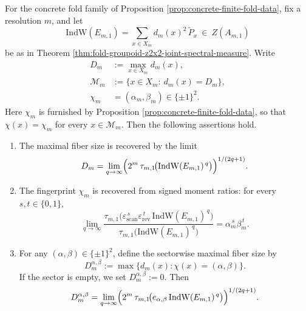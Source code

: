 \begin{corollary}\label{cor:fold-indw-high-q-extract-maxfiber-and-chi}

For the concrete fold family of Proposition \ref{prop:concrete-finite-fold-data}, fix a resolution \(m\), and let
\[
\mathrm{IndW}(E_{m,1})=\sum_{x\in X_m}d_m(x)^2\,\widetilde P_x\ \in\ Z(A_{m,1})
\]
be as in Theorem \ref{thm:fold-groupoid-z2x2-joint-spectral-measure}.
Write
\[
\begin{aligned}
D_m&:=\max_{x\in X_m}d_m(x),\\
\mathcal M_m&:=\{x\in X_m:\ d_m(x)=D_m\},\\
\chi_m&=(\alpha_m,\beta_m)\in\{\pm1\}^2.
\end{aligned}
\]
Here \(\chi_m\) is furnished by Proposition \ref{prop:concrete-finite-fold-data}, so that \(\chi(x)=\chi_m\) for every \(x\in\mathcal M_m\).
Then the following assertions hold.
\begin{enumerate}
\normalfont
  \item The maximal fiber size is recovered by the limit
  \[
  D_m
  =
  \lim_{q\to\infty}\Bigl(2^m\,\tau_{m,1}\!\bigl(\mathrm{IndW}(E_{m,1})^{\,q}\bigr)\Bigr)^{1/(2q+1)}.
  \]
  \item The fingerprint \(\chi_m\) is recovered from signed moment ratios: for every \(s,t\in\{0,1\}\),
  \[
  \lim_{q\to\infty}
  \frac{\tau_{m,1}\!\bigl(\varepsilon_{\mathrm{scan}}^{\,s}\varepsilon_{\mathrm{rev}}^{\,t}\,\mathrm{IndW}(E_{m,1})^{\,q}\bigr)}
  {\tau_{m,1}\!\bigl(\mathrm{IndW}(E_{m,1})^{\,q}\bigr)}
  =
  \alpha_m^{\,s}\beta_m^{\,t}.
  \]
  \item For any \((\alpha,\beta)\in\{\pm1\}^2\), define the sectorwise maximal fiber size by
  \[
  D_m^{\alpha,\beta}
  :=
  \max\{d_m(x):\chi(x)=(\alpha,\beta)\}.
  \]
  If the sector is empty, we set \(D_m^{\alpha,\beta}:=0\).
  Then
  \[
  D_m^{\alpha,\beta}
  =
  \lim_{q\to\infty}\Bigl(2^m\,\tau_{m,1}\!\bigl(e_{\alpha,\beta}\,\mathrm{IndW}(E_{m,1})^{\,q}\bigr)\Bigr)^{1/(2q+1)}.
  \]
\end{enumerate}
\end{corollary}
